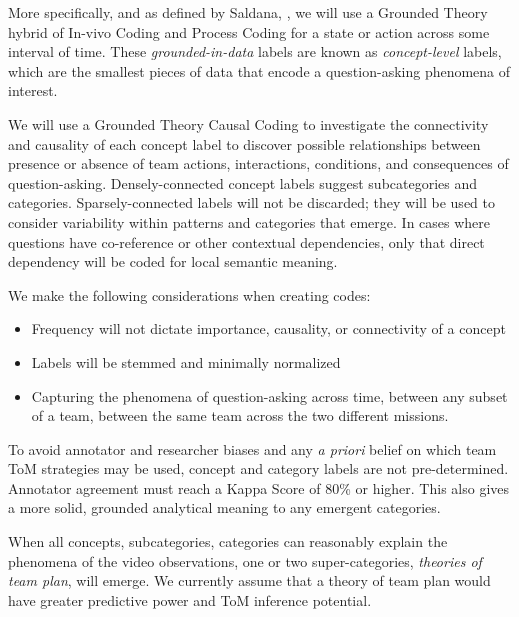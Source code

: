 More specifically, and as defined by Saldana, \citep{saldana_2021}, we will use a Grounded Theory hybrid of In-vivo Coding and Process Coding for a state or action across some interval of time. These \textit{grounded-in-data} labels are known as \textit{concept-level} labels, which are the smallest pieces of data that encode a question-asking phenomena of interest.

We will use a Grounded Theory Causal Coding to investigate the connectivity and causality of each concept label to discover possible relationships between presence or absence of team actions, interactions, conditions, and consequences of question-asking. Densely-connected concept labels suggest subcategories and categories. Sparsely-connected labels will not be discarded; they will be used to consider variability within patterns and categories that emerge. In cases where questions have co-reference or other contextual dependencies, only that direct dependency will be coded for local semantic meaning.

\vspace{15pt}

We make the following considerations when creating codes: 

\begin{itemize}
    \item Frequency will not dictate importance, causality, or connectivity of a concept
    \item Labels will be stemmed and minimally normalized 
    \item Capturing the phenomena of question-asking across time, between any subset of a team, between the same team across the two different missions. 
\end{itemize}

\vspace{15pt}

To avoid annotator and researcher biases and any \textit{a priori} belief on
which team ToM strategies may be used, concept and category labels are not
pre-determined. Annotator agreement must reach a Kappa Score of 80\% or higher. This also gives a more solid, grounded analytical meaning to any emergent categories. 

When all concepts, subcategories, categories can reasonably explain the phenomena of the video observations, one or two super-categories, \textit{theories of team plan}, will emerge. We currently assume that a theory of team plan would have greater predictive power and ToM inference potential. 


